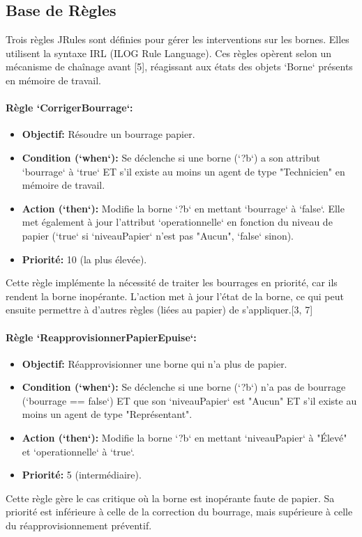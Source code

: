 \documentclass[11pt,a4paper]{article}
\begin{document}
\subsection{Base de Règles}

Trois règles JRules sont définies pour gérer les interventions sur les bornes. Elles utilisent la syntaxe IRL (ILOG Rule Language). Ces règles opèrent selon un mécanisme de chaînage avant [5], réagissant aux états des objets `Borne` présents en mémoire de travail.

\paragraph{Règle `CorrigerBourrage`:}
\begin{itemize}
    \item \textbf{Objectif:} Résoudre un bourrage papier.
    \item \textbf{Condition (`when`):} Se déclenche si une borne (`?b`) a son attribut `bourrage` à `true` ET s'il existe au moins un agent de type "Technicien" en mémoire de travail.
    \item \textbf{Action (`then`):} Modifie la borne `?b` en mettant `bourrage` à `false`. Elle met également à jour l'attribut `operationnelle` en fonction du niveau de papier (`true` si `niveauPapier` n'est pas "Aucun", `false` sinon).
    \item \textbf{Priorité:} 10 (la plus élevée).
\end{itemize}
Cette règle implémente la nécessité de traiter les bourrages en priorité, car ils rendent la borne inopérante. L'action met à jour l'état de la borne, ce qui peut ensuite permettre à d'autres règles (liées au papier) de s'appliquer.[3, 7]

\paragraph{Règle `ReapprovisionnerPapierEpuise`:}
\begin{itemize}
    \item \textbf{Objectif:} Réapprovisionner une borne qui n'a plus de papier.
    \item \textbf{Condition (`when`):} Se déclenche si une borne (`?b`) n'a pas de bourrage (`bourrage == false`) ET que son `niveauPapier` est "Aucun" ET s'il existe au moins un agent de type "Représentant".
    \item \textbf{Action (`then`):} Modifie la borne `?b` en mettant `niveauPapier` à "Élevé" et `operationnelle` à `true`.
    \item \textbf{Priorité:} 5 (intermédiaire).
\end{itemize}
Cette règle gère le cas critique où la borne est inopérante faute de papier. Sa priorité est inférieure à celle de la correction du bourrage, mais supérieure à celle du réapprovisionnement préventif.
\end{document}
